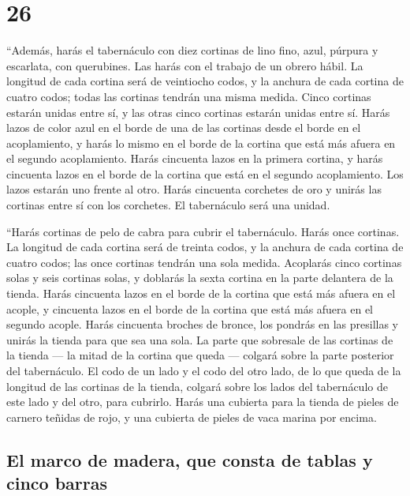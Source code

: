 \hypertarget{section-25}{%
\section{26}\label{section-25}}

 ``Además, harás el tabernáculo con diez cortinas de lino
fino, azul, púrpura y escarlata, con querubines. Las harás con el
trabajo de un obrero hábil.  La longitud de cada cortina
será de veintiocho codos, y la anchura de cada cortina de cuatro codos;
todas las cortinas tendrán una misma medida.  Cinco
cortinas estarán unidas entre sí, y las otras cinco cortinas estarán
unidas entre sí.  Harás lazos de color azul en el borde de
una de las cortinas desde el borde en el acoplamiento, y harás lo mismo
en el borde de la cortina que está más afuera en el segundo
acoplamiento.  Harás cincuenta lazos en la primera
cortina, y harás cincuenta lazos en el borde de la cortina que está en
el segundo acoplamiento. Los lazos estarán uno frente al otro.
 Harás cincuenta corchetes de oro y unirás las cortinas
entre sí con los corchetes. El tabernáculo será una unidad.

 ``Harás cortinas de pelo de cabra para cubrir el
tabernáculo. Harás once cortinas.  La longitud de cada
cortina será de treinta codos, y la anchura de cada cortina de cuatro
codos; las once cortinas tendrán una sola medida. 
Acoplarás cinco cortinas solas y seis cortinas solas, y doblarás la
sexta cortina en la parte delantera de la tienda.  Harás
cincuenta lazos en el borde de la cortina que está más afuera en el
acople, y cincuenta lazos en el borde de la cortina que está más afuera
en el segundo acople.  Harás cincuenta broches de bronce,
los pondrás en las presillas y unirás la tienda para que sea una sola.
 La parte que sobresale de las cortinas de la tienda ---
la mitad de la cortina que queda --- colgará sobre la parte posterior
del tabernáculo.  El codo de un lado y el codo del otro
lado, de lo que queda de la longitud de las cortinas de la tienda,
colgará sobre los lados del tabernáculo de este lado y del otro, para
cubrirlo.  Harás una cubierta para la tienda de pieles de
carnero teñidas de rojo, y una cubierta de pieles de vaca marina por
encima.

\hypertarget{el-marco-de-madera-que-consta-de-tablas-y-cinco-barras}{%
\subsection{El marco de madera, que consta de tablas y cinco
barras}\label{el-marco-de-madera-que-consta-de-tablas-y-cinco-barras}}

